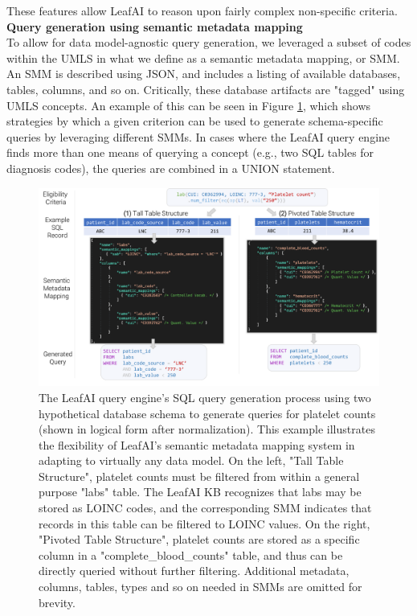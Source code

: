 \documentclass[../main.tex]{subfiles}
\begin{document}
\noindent These features allow LeafAI to reason upon fairly complex non-specific criteria. \\

\noindent \textbf{Query generation using semantic metadata mapping} \\
To allow for data model-agnostic query generation, we leveraged a subset of codes within the UMLS in what we define as a semantic metadata mapping, or SMM. An SMM is described using JSON, and includes a listing of available databases, tables, columns, and so on. Critically, these database artifacts are "tagged" using UMLS concepts. An example of this can be seen in Figure \ref{aim2_fig_leafai_smm}, which shows strategies by which a given criterion can be used to generate schema-specific queries by leveraging different SMMs. In cases where the LeafAI query engine finds more than one means of querying a concept (e.g., two SQL tables for diagnosis codes), the queries are combined in a UNION statement.

\begin{figure}[h]
  \includegraphics[scale=0.56]{Figures/Aim2/aim2_leafai_smm.pdf}  
\caption{The LeafAI query engine's SQL query generation process using two hypothetical database schema to generate queries for platelet counts (shown in logical form after normalization). This example illustrates the flexibility of LeafAI's semantic metadata mapping system in adapting to virtually any data model. On the left, "Tall Table Structure", platelet counts must be filtered from within a general purpose "labs" table. The LeafAI KB recognizes that labs may be stored as LOINC codes, and the corresponding SMM indicates that records in this table can be filtered to LOINC values. On the right, "Pivoted Table Structure", platelet counts are stored as a specific column in a "complete\_blood\_counts" table, and thus can be directly queried without further filtering. Additional metadata, columns, tables, types and so on needed in SMMs are omitted for brevity.}
\label{aim2_fig_leafai_smm}
\end{figure}
\end{document}

